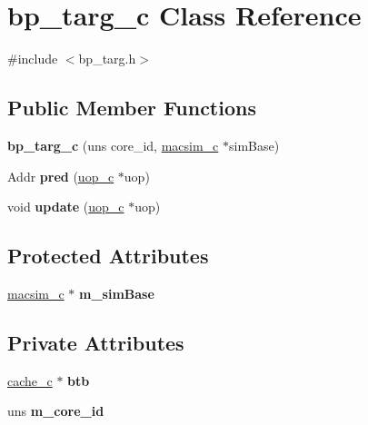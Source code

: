 \hypertarget{classbp__targ__c}{
\section{bp\_\-targ\_\-c Class Reference}
\label{classbp__targ__c}
}


{\ttfamily \#include $<$bp\_\-targ.h$>$}

\subsection*{Public Member Functions}
\begin{DoxyCompactItemize}
\item 
\hypertarget{classbp__targ__c_a84d6b601bdabdd5ea804e83cf8a782a4}{
{\bfseries bp\_\-targ\_\-c} (uns core\_\-id, \hyperlink{classmacsim__c}{macsim\_\-c} $\ast$simBase)}
\label{classbp__targ__c_a84d6b601bdabdd5ea804e83cf8a782a4}

\item 
\hypertarget{classbp__targ__c_a50e579ddc1d8b2014955649535a4ab8c}{
Addr {\bfseries pred} (\hyperlink{classuop__c}{uop\_\-c} $\ast$uop)}
\label{classbp__targ__c_a50e579ddc1d8b2014955649535a4ab8c}

\item 
\hypertarget{classbp__targ__c_a855b2b9a8d851976301c29df9de040fc}{
void {\bfseries update} (\hyperlink{classuop__c}{uop\_\-c} $\ast$uop)}
\label{classbp__targ__c_a855b2b9a8d851976301c29df9de040fc}

\end{DoxyCompactItemize}
\subsection*{Protected Attributes}
\begin{DoxyCompactItemize}
\item 
\hypertarget{classbp__targ__c_a8b2a93e731b675e971842e66953e3e6b}{
\hyperlink{classmacsim__c}{macsim\_\-c} $\ast$ {\bfseries m\_\-simBase}}
\label{classbp__targ__c_a8b2a93e731b675e971842e66953e3e6b}

\end{DoxyCompactItemize}
\subsection*{Private Attributes}
\begin{DoxyCompactItemize}
\item 
\hypertarget{classbp__targ__c_a01a71175e81ce237a8db74ea50ee39e7}{
\hyperlink{classcache__c}{cache\_\-c} $\ast$ {\bfseries btb}}
\label{classbp__targ__c_a01a71175e81ce237a8db74ea50ee39e7}

\item 
\hypertarget{classbp__targ__c_ab59c9682db97bf0a992321c89b521993}{
uns {\bfseries m\_\-core\_\-id}}
\label{classbp__targ__c_ab59c9682db97bf0a992321c89b521993}

\end{DoxyCompactItemize}


